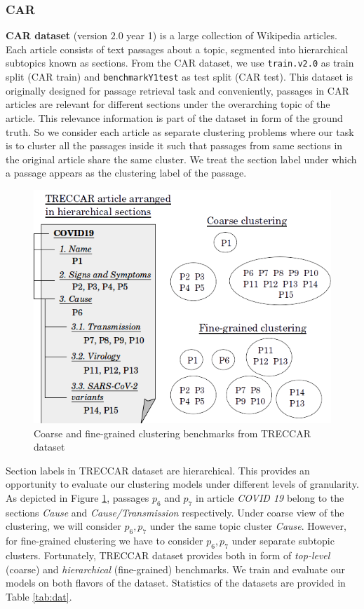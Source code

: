 \documentclass[11pt,a4paper]{article}
\begin{document}
\subsubsection{CAR} \textbf{CAR dataset} (version $2.0$ year 1) is a large collection of Wikipedia articles. Each article consists of text passages about a topic, segmented into hierarchical subtopics known as sections. From the CAR dataset, we use \texttt{train.v2.0} as train split (CAR train) and \texttt{benchmarkY1test} as test split (CAR test).  This dataset is originally designed for passage retrieval task and conveniently, passages in CAR articles are relevant for different sections under the overarching topic of the article. This relevance information is part of the dataset in form of the ground truth. So we consider each article as separate clustering problems where our task is to cluster all the passages inside it such that passages from same sections in the original article share the same cluster. We treat the section label under which a passage appears as the clustering label of the passage.

\begin{figure}[t]
    \centering
    \includegraphics[scale=0.5]{acl-ijcnlp2021-templates/wiki_articles.png}
    \caption{Coarse and fine-grained clustering benchmarks from TRECCAR dataset}
    \label{fig:wiki}
\end{figure}

Section labels in TRECCAR dataset are hierarchical. This provides an opportunity to evaluate our clustering models under different levels of granularity. As depicted in Figure \ref{fig:wiki}, passages $p_6$ and $p_7$ in article \textit{COVID 19}  belong to the sections \textit{Cause} and \textit{Cause/Transmission} respectively. Under coarse view of the clustering, we will consider $p_6,p_7$ under the same topic cluster \textit{Cause}. However, for fine-grained clustering we have to consider $p_6,p_7$ under separate subtopic clusters. Fortunately, TRECCAR dataset provides both in form of \textit{top-level} (coarse) and \textit{hierarchical} (fine-grained) benchmarks. We train and evaluate our models on both flavors of the dataset. Statistics of the datasets are provided in Table \ref{tab:dat}.
\end{document}
